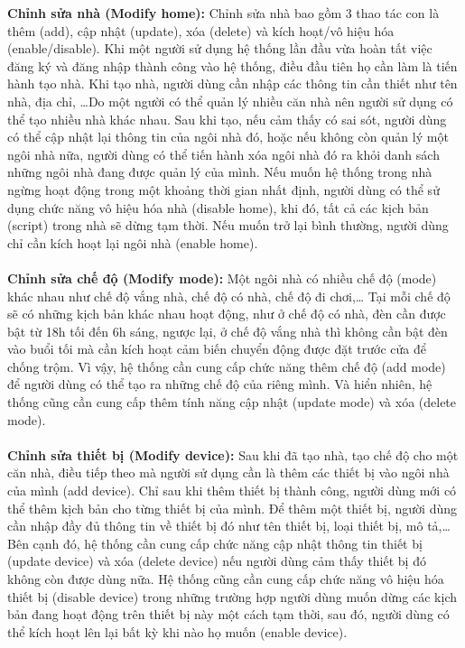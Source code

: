 \documentclass[12pt,a4paper,oneside]{extbook}
\begin{document}
\noindent
\textbf{Chỉnh sửa nhà (Modify home):} Chỉnh sửa nhà bao gồm 3 thao tác con là thêm (add), cập nhật (update), xóa (delete) và kích hoạt/vô hiệu hóa (enable/disable). Khi một người sử dụng hệ thống lần đầu vừa hoàn tất việc đăng ký và đăng nhập thành công vào hệ thống, điều đầu tiên họ cần làm là tiến hành tạo nhà. Khi tạo nhà, người dùng cần nhập các thông tin cần thiết như tên nhà, địa chỉ, …Do một người có thể quản lý nhiều căn nhà nên người sử dụng có thể tạo nhiều nhà khác nhau. Sau khi tạo, nếu cảm thấy có sai sót, người dùng có thể cập nhật lại thông tin của ngôi nhà đó, hoặc nếu không còn quản lý một ngôi nhà nữa, người dùng có thể tiến hành xóa ngôi nhà đó ra khỏi danh sách những ngôi nhà đang được quản lý của mình. Nếu muốn hệ thống trong nhà ngừng hoạt động trong một khoảng thời gian nhất định, người dùng có thể sử dụng chức năng vô hiệu hóa nhà (disable home), khi đó, tất cả các kịch bản (script) trong nhà sẽ dừng tạm thời. Nếu muốn trở lại bình thường, người dùng chỉ cần kích hoạt lại ngôi nhà (enable home).\\\\
\textbf{Chỉnh sửa chế độ (Modify mode):} Một ngôi nhà có nhiều chế độ (mode) khác nhau như chế độ vắng nhà, chế độ có nhà, chế độ đi chơi,\dots\hspace{0mm} Tại mỗi chế độ sẽ có những kịch bản khác nhau hoạt động, như ở chế độ có nhà, đèn cần được bật từ 18h tối đến 6h sáng, ngược lại, ở chế độ vắng nhà thì không cần bật đèn vào buổi tối mà cần kích hoạt cảm biến chuyển động được đặt trước cửa để chống trộm. Vì vậy, hệ thống cần cung cấp chức năng thêm chế độ (add mode) để người dùng có thể tạo ra những chế độ của riêng mình. Và hiển nhiên, hệ thống cũng cần cung cấp thêm tính năng cập nhật (update mode) và xóa (delete mode).\\\\
\textbf{Chỉnh sửa thiết bị (Modify device):} Sau khi đã tạo nhà, tạo chế độ cho một căn nhà, điều tiếp theo mà người sử dụng cần là thêm các thiết bị vào ngôi nhà của mình (add device). Chỉ sau khi thêm thiết bị thành công, người dùng mới có thể thêm kịch bản cho từng thiết bị của mình. Để thêm một thiết bị, người dùng cần nhập đầy đủ thông tin về thiết bị đó như tên thiết bị, loại thiết bị, mô tả,\dots\hspace{0mm} Bên cạnh đó, hệ thống cần cung cấp chức năng cập nhật thông tin thiết bị (update device) và xóa (delete device) nếu người dùng cảm thấy thiết bị đó không còn được dùng nữa. Hệ thống cũng cần cung cấp chức năng vô hiệu hóa thiết bị (disable device) trong những trường hợp người dùng muốn dừng các kịch bản đang hoạt động trên thiết bị này một cách tạm thời, sau đó, người dùng có thể kích hoạt lên lại bất kỳ khi nào họ muốn (enable device).\\
\end{document}
